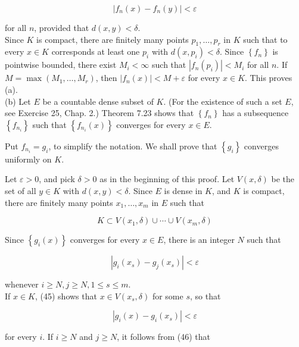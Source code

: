 \documentclass[10pt]{article}
\begin{document}
\begin{equation*}
\left|f_{n}(x)-f_{n}(y)\right|<\varepsilon \tag{44}
\end{equation*}


for all $n$, provided that $d(x, y)<\delta$.\\
Since $K$ is compact, there are finitely many points $p_{1}, \ldots, p_{r}$ in $K$ such that to every $x \in K$ corresponds at least one $p_{i}$ with $d\left(x, p_{i}\right)<\delta$. Since $\left\{f_{n}\right\}$ is pointwise bounded, there exist $M_{i}<\infty$ such that $\left|f_{n}\left(p_{i}\right)\right|<M_{i}$ for all $n$. If $M=\max \left(M_{1}, \ldots, M_{r}\right)$, then $\left|f_{n}(x)\right|<M+\varepsilon$ for every $x \in K$. This proves (a).\\
(b) Let $E$ be a countable dense subset of $K$. (For the existence of such a set $E$, see Exercise 25, Chap. 2.) Theorem 7.23 shows that $\left\{f_{n}\right\}$ has a subsequence $\left\{f_{n_{i}}\right\}$ such that $\left\{f_{n_{i}}(x)\right\}$ converges for every $x \in E$.

Put $f_{n_{i}}=g_{i}$, to simplify the notation. We shall prove that $\left\{g_{i}\right\}$ converges uniformly on $K$.

Let $\varepsilon>0$, and pick $\delta>0$ as in the beginning of this proof. Let $V(x, \delta)$ be the set of all $y \in K$ with $d(x, y)<\delta$. Since $E$ is dense in $K$, and $K$ is compact, there are finitely many points $x_{1}, \ldots, x_{m}$ in $E$ such that


\begin{equation*}
K \subset V\left(x_{1}, \delta\right) \cup \cdots \cup V\left(x_{m}, \delta\right) \tag{45}
\end{equation*}


Since $\left\{g_{i}(x)\right\}$ converges for every $x \in E$, there is an integer $N$ such that


\begin{equation*}
\left|g_{i}\left(x_{s}\right)-g_{j}\left(x_{s}\right)\right|<\varepsilon \tag{46}
\end{equation*}


whenever $i \geq N, j \geq N, 1 \leq s \leq m$.\\
If $x \in K$, (45) shows that $x \in V\left(x_{s}, \delta\right)$ for some $s$, so that

$$
\left|g_{i}(x)-g_{i}\left(x_{s}\right)\right|<\varepsilon
$$

for every $i$. If $i \geq N$ and $j \geq N$, it follows from (46) that
\end{document}
